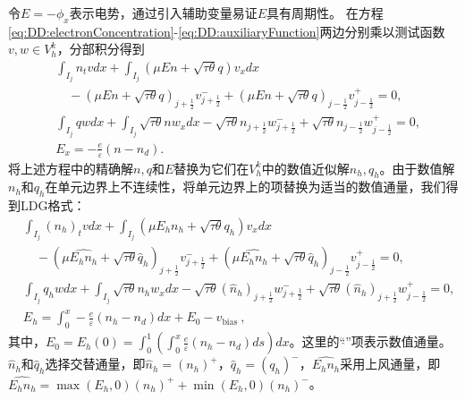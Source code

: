 令$E = -\phi_x$表示电势，通过引入辅助变量易证$E$具有周期性\cite{liu2010error}。
在方程\eqref{eq:DD:electronConcentration}-\eqref{eq:DD:auxiliaryFunction}两边分别乘以测试函数$v,w\in V_h^k$，分部积分得到
\begin{align}
     & \int_{I_{j}} n_{t} v d x+\int_{I_{j}}(\mu E n+\sqrt{\tau \theta} q) v_{x} d x                                                                               \nonumber                                      \\
     & \quad-(\mu E n+\sqrt{\tau \theta} q)_{j+\frac{1}{2}} v_{j+\frac{1}{2}}^{-}+(\mu E n+\sqrt{\tau \theta} q)_{j-\frac{1}{2}} v_{j-\frac{1}{2}}^{+}=0,            \label{eq:LDG:n}                             \\
     & \int_{I_{j}} q w d x+\int_{I_{j}} \sqrt{\tau \theta} n w_{x} d x-\sqrt{\tau \theta} n_{j+\frac{1}{2}} w_{j+\frac{1}{2}}^{-}+\sqrt{\tau \theta} n_{j-\frac{1}{2}} w_{j-\frac{1}{2}}^{+}=0, \label{eq:LDG:q} \\
     & E_{x}=-\frac{e}{\varepsilon}\left(n-n_{d}\right) .
\end{align}
将上述方程中的精确解$n, q$和$E$替换为它们在$V_{h}^{k}$中的数值近似解$n_h, q_h$。由于数值解$n_h$和$q_h$在单元边界上不连续性，将单元边界上的项替换为适当的数值通量，我们得到LDG格式：
\begin{align}
     & \int_{I_{j}}\left(n_h\right)_{t} v d x+\int_{I_{j}}\left(\mu E_h n_h+\sqrt{\tau \theta} q_h\right) v_{x} d x      \nonumber                                                                                                                    \\
     & \quad-\left(\mu \widehat{E_h n_h}+\sqrt{\tau \theta} \hat{q}_{h}\right)_{j+\frac{1}{2}} v_{j+\frac{1}{2}}^{-}+\left(\mu \widehat{E_h n_h}+\sqrt{\tau \theta} \hat{q}_{h}\right)_{j-\frac{1}{2}} v_{j-\frac{1}{2}}^{+}=0, \label{eq:DDLDGn}     \\
     & \int_{I_{j}} q_h w d x+\int_{I_{j}} \sqrt{\tau \theta} n_h w_{x} d x-\sqrt{\tau \theta} (\hat{n}_h)_{j+\frac{1}{2}} w_{j+\frac{1}{2}}^{-}+\sqrt{\tau \theta} (\hat{n}_h)_{j+\frac{1}{2}} w_{j-\frac{1}{2}}^{+}=0,            \label{eq:DDLDGq} \\
     & E_h=\int_{0}^{x}-\frac{e}{\varepsilon}\left(n_h-n_{d}\right) d x+E_{0}-v_{\text {bias }},\label{eq:DDLDGE}
\end{align}
其中，$E_{0}=E_h(0)=\int_{0}^{1}\left(\int_{0}^{x} \frac{e}{\varepsilon}\left(n_h-n_{d}\right) d s\right) d x$。这里的“$\hat{}$”项表示数值通量。$\hat{n}_{h}$和$\hat{q}_{h}$选择交替通量，即$\hat{n}_{h}=\left(n_h\right)^{+}$，$\hat{q}_{h}=\left(q_h\right)^{-}$，$\widehat{E_h n_h}$采用上风通量，即$\widehat{E_h n_h}=\max \left(E_h, 0\right)\left(n_h\right)^{+}+\min \left(E_h, 0\right)\left(n_h\right)^{-}$。

